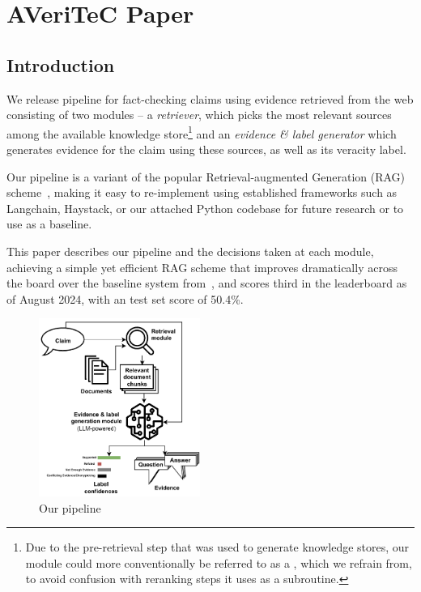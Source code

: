 
\chapter{AVeriTeC Paper}
\section{Introduction}
\label{sec:introduction}
We release  pipeline for fact-checking claims using evidence retrieved from the web consisting of two modules -- a \textit{retriever}, which picks the most relevant sources among the available knowledge store\footnote{Due to the pre-retrieval step that was used to generate knowledge stores, our  module could more conventionally be referred to as a , which we refrain from, to avoid confusion with reranking steps it uses as a subroutine.} and an \textit{evidence \& label generator} which generates evidence for the claim using these sources, as well as its veracity label. 

Our pipeline is a variant of the popular Retrieval-augmented Generation (RAG) scheme~\cite{rag}, making it easy to re-implement using established frameworks such as Langchain, Haystack, or our attached Python codebase for future research or to use as a baseline.

This paper describes our pipeline and the decisions taken at each module, achieving a simple yet efficient RAG scheme that improves dramatically across the board over the baseline system from~\cite{averitec2024}, and scores third in the \averitec{} leaderboard as of August 2024, with an \averitec{} test set score of 50.4\%.

\begin{figure}[h]
    \centering
    \includegraphics[width=0.47\textwidth]{figures/pipeline.pdf}
    \caption{Our pipeline}
    \label{fig:pipeline}
\end{figure}

